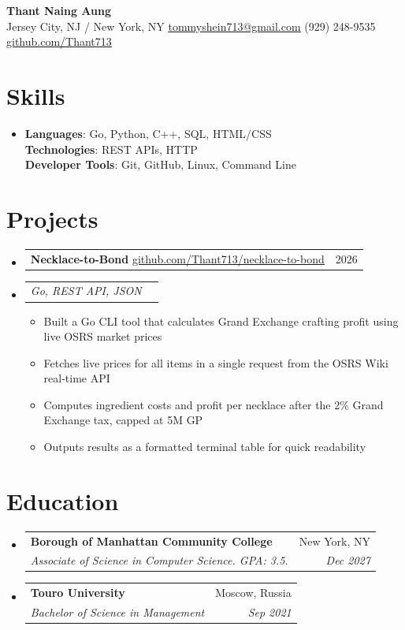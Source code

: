 \documentclass[letterpaper,11pt]{article}
\makeatletter
\newcommand{\resumeItem}[1]{
  \item{
    {#1 \vspace{-2pt}}
  }
}
\newcommand{\resumeSubheading}[4]{
  \vspace{-2pt}\item
    \begin{tabular*}{0.97\textwidth}[t]{l@{\extracolsep{\fill}}r}
      \textbf{#1} & #2 \\
      \textit{#3} & \textit{#4} \\
    \end{tabular*}\vspace{-7pt}
}
\newcommand{\resumeSubSubheading}[2]{
    \item
    \begin{tabular*}{0.97\textwidth}{l@{\extracolsep{\fill}}r}
      \textit{#1} & \textit{#2} \\
    \end{tabular*}\vspace{-7pt}
}
\newcommand{\resumeProjectHeading}[2]{
    \item
    \begin{tabular*}{0.97\textwidth}{l@{\extracolsep{\fill}}r}
      #1 & #2 \\
    \end{tabular*}\vspace{-7pt}
}
\newcommand{\resumeSubHeadingListStart}{\begin{itemize}[leftmargin=0.15in, label={}]}
\newcommand{\resumeSubHeadingListEnd}{\end{itemize}}
\newcommand{\resumeItemListStart}{\begin{itemize}}
\newcommand{\resumeItemListEnd}{\end{itemize}\vspace{-5pt}}
\makeatother
\begin{document}
\begin{center}
    {\fontsize{16}{20}\selectfont\bfseries Thant Naing Aung} \\ \vspace{1pt}
    Jersey City, NJ / New York, NY \textbar{} \href{mailto:tommyshein713@gmail.com}{\underline{tommyshein713@gmail.com}} \textbar{} (929) 248-9535 \textbar{}
    \href{https://github.com/Thant713}{\underline{github.com/Thant713}}
\end{center}

\section{Skills}
 \begin{itemize}[leftmargin=0.15in, label={}]
    \item{
     \textbf{Languages}{: Go, Python, C++, SQL, HTML/CSS} \\
     \textbf{Technologies}{: REST APIs, HTTP} \\
     \textbf{Developer Tools}{: Git, GitHub, Linux, Command Line}
    }
 \end{itemize}

\section{Projects}
  \resumeSubHeadingListStart
\resumeProjectHeading
  {\textbf{Necklace-to-Bond} \textbar{} \href{https://github.com/Thant713/necklace-to-bond}{\underline{github.com/Thant713/necklace-to-bond}}}{2026}
  \resumeSubSubheading{\emph{Go, REST API, JSON}}{}
      \resumeItemListStart
\resumeItem{Built a Go CLI tool that calculates Grand Exchange crafting profit using live OSRS market prices}
\resumeItem{Fetches live prices for all items in a single request from the OSRS Wiki real-time API}
\resumeItem{Computes ingredient costs and profit per necklace after the 2\% Grand Exchange tax, capped at 5M GP}
\resumeItem{Outputs results as a formatted terminal table for quick readability}
      \resumeItemListEnd
  \resumeSubHeadingListEnd

\section{Education}
  \resumeSubHeadingListStart
    \resumeSubheading
      {Borough of Manhattan Community College}{New York, NY}
      {Associate of Science in Computer Science. GPA: 3.5.}{Dec 2027}
    \resumeSubheading
      {Touro University}{Moscow, Russia}
      {Bachelor of Science in Management}{Sep 2021}
  \resumeSubHeadingListEnd
\end{document}
